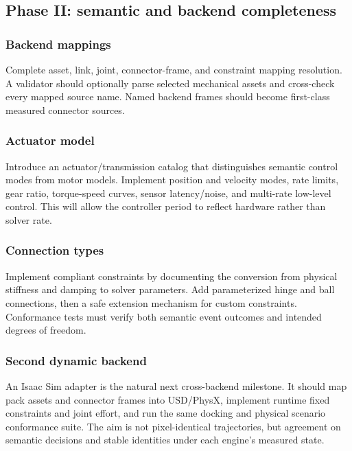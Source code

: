 \subsection{Phase II: semantic and backend completeness}

\subsubsection{Backend mappings}

Complete asset, link, joint, connector-frame, and constraint mapping resolution. A
validator should optionally parse selected mechanical assets and cross-check every
mapped source name. Named backend frames should become first-class measured connector
sources.

\subsubsection{Actuator model}

Introduce an actuator/transmission catalog that distinguishes semantic control modes
from motor models. Implement position and velocity modes, rate limits, gear ratio,
torque-speed curves, sensor latency/noise, and multi-rate low-level control. This will
allow the controller period to reflect hardware rather than solver rate.

\subsubsection{Connection types}

Implement compliant constraints by documenting the conversion from physical stiffness
and damping to solver parameters. Add parameterized hinge and ball connections, then a
safe extension mechanism for custom constraints. Conformance tests must verify both
semantic event outcomes and intended degrees of freedom.

\subsubsection{Second dynamic backend}

An Isaac Sim adapter is the natural next cross-backend milestone. It should map pack
assets and connector frames into USD/PhysX, implement runtime fixed constraints and
joint effort, and run the same docking and physical scenario conformance suite. The aim
is not pixel-identical trajectories, but agreement on semantic decisions and stable
identities under each engine's measured state.

